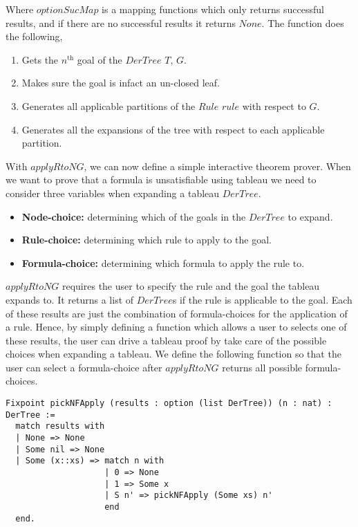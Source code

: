 \documentclass{article}
\begin{document}
Where $optionSucMap$ is a mapping functions which only returns successful
results, and if there are no successful results it returns $None$.
The function does the following,

\begin{enumerate}
\item Gets the $n^{\text{th}}$ goal of the $DerTree$ $T$, $G$.
\item Makes sure the goal is infact an un-closed leaf.
\item Generates all applicable partitions of the $Rule$ $rule$ with respect to
      $G$.
\item Generates all the expansions of the tree with respect to each applicable
partition.
\end{enumerate}

With $applyRtoNG$, we can now define a simple interactive theorem prover. When
we want to prove that a formula is unsatisfiable using tableau we need to
consider three variables when expanding a tableau $DerTree$.

\begin{itemize}
\item \textbf{Node-choice:} determining which of the goals in the $DerTree$ to
expand.
\item \textbf{Rule-choice:} determining which rule to apply to the goal.
\item \textbf{Formula-choice:} determining which formula to apply the rule to.
\end{itemize}

$applyRtoNG$ requires the user to specify the rule and the goal the tableau
expands to. It returns a list of $DerTree$s if the rule is applicable to the
goal. Each of these results are just the combination of formula-choices for
the application of a rule. Hence, by simply defining a function which allows a
user to selects one of these results, the user can drive a tableau proof by
take care of the possible choices when expanding a tableau. We define the
following function so that the user can select a formula-choice after
$applyRtoNG$ returns all possible formula-choices.

\begin{lstlisting}
Fixpoint pickNFApply (results : option (list DerTree)) (n : nat) : DerTree :=
  match results with
  | None => None
  | Some nil => None
  | Some (x::xs) => match n with
                    | 0 => None
                    | 1 => Some x
                    | S n' => pickNFApply (Some xs) n'
                    end
  end.
\end{lstlisting}
\end{document}
